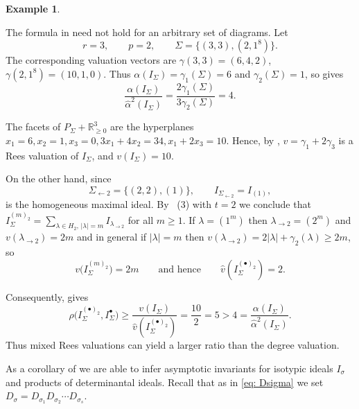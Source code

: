 \documentclass[11pt, reqno]{amsart}
\numberwithin{equation}{section}
\theoremstyle{definition}
\newtheorem{example}[theorem]{Example}
\newcommand{\RR}{{\mathbb R}}
\renewcommand{\l}{\lambda}
\newcommand{\s}{\sigma}
\begin{document}
\begin{example}\label{ex: mixed Rees valuation counterexample}

The formula in  need not hold for an arbitrary set of diagrams. Let
\[
r=3,\qquad p=2,\qquad
\Sigma=\{(3,3),(2,1^8)\}.
\]
The corresponding valuation vectors are
$\gamma(3,3)=(6,4,2)$,
$\gamma(2,1^8)=(10,1,0)$.
Thus $\alpha(I_\Sigma)=\gamma_1(\Sigma)=6$ and
$\gamma_2(\Sigma)=1$, so  gives
\[
\frac{\alpha(I_\Sigma)}{\widehat{\alpha}^2(I_\Sigma)}
=\frac{2\gamma_1(\Sigma)}{3\gamma_2(\Sigma)}=4.
\]

The facets of $P_\Sigma+\RR_{\geq0}^3$ are the hyperplanes $x_1=6, x_2=1,x_3=0, 3x_1+4x_2=34, x_1+2x_3=10$.
Hence, by
,
$
v=\gamma_1+2\gamma_3
$
is a Rees valuation of $I_\Sigma$, and $v(I_\Sigma)=10$.

On the other hand, since
\[
\Sigma_{\leftarrow2}=\{(2,2),(1)\},
\qquad
I_{\Sigma_{\leftarrow2}}=I_{(1)},
\]
is the homogeneous maximal ideal. By ~(3) with $t=2$ we conclude that  $I_\Sigma^{(m)_2}=\sum_{\lambda\in H_2, \, |\lambda|=m} I_{\l_{\rightarrow 2}}$ for all $m\geq 1$. If $\l=(1^m)$ then $ \l_{\rightarrow 2}=(2^m)$ and $v(\l_{\rightarrow 2})=2m$ and in general if $|\l|=m$ then $v(\l_{\rightarrow 2})=2|\l|+\gamma_2(\l)\geq 2m$, so
\[
v\bigl(I_\Sigma^{(m)_2}\bigr)= 2m \qquad\text{and hence}\qquad
\widehat v(I_\Sigma^{(\bullet)_2})= 2.
\]

Consequently,  gives
\[
\widehat{\rho}
 \bigl(I_\Sigma^{(\bullet)_2},I_\Sigma^\bullet\bigr)
\geq
\frac{v(I_\Sigma)}{\widehat v(I_\Sigma^{(\bullet)_2})}
= \frac{10}{2}=5>4
=\frac{\alpha(I_\Sigma)}{\widehat{\alpha}^2(I_\Sigma)}.
\]
Thus mixed Rees valuations can yield a larger ratio than the degree valuation.

\end{example}

As a corollary of  we are able to infer asymptotic invariants for isotypic ideals $I_\s$ and products of determinantal ideals. Recall that as in \eqref{eq: Dsigma} we set $D_\sigma = D_{\sigma_1}D_{\sigma_2}\cdots D_{\sigma_s}$.
\end{document}

